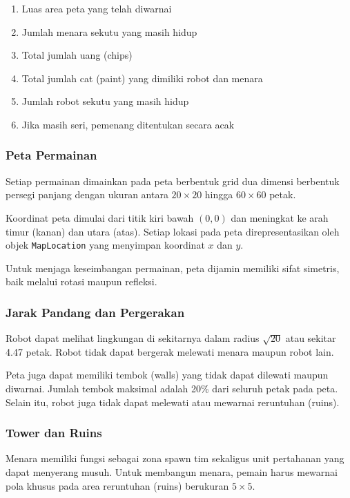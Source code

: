 \begin{enumerate}
\item Luas area peta yang telah diwarnai
\item Jumlah menara sekutu yang masih hidup
\item Total jumlah uang (chips)
\item Total jumlah cat (paint) yang dimiliki robot dan menara
\item Jumlah robot sekutu yang masih hidup
\item Jika masih seri, pemenang ditentukan secara acak
\end{enumerate}

\subsubsection{Peta Permainan}

Setiap permainan dimainkan pada peta berbentuk grid dua dimensi berbentuk persegi panjang dengan ukuran antara $20 \times 20$ hingga $60 \times 60$ petak.

Koordinat peta dimulai dari titik kiri bawah $(0,0)$ dan meningkat ke arah timur (kanan) dan utara (atas). Setiap lokasi pada peta direpresentasikan oleh objek \texttt{MapLocation} yang menyimpan koordinat $x$ dan $y$.

Untuk menjaga keseimbangan permainan, peta dijamin memiliki sifat simetris, baik melalui rotasi maupun refleksi.

\subsubsection{Jarak Pandang dan Pergerakan}

Robot dapat melihat lingkungan di sekitarnya dalam radius $\sqrt{20}$ atau sekitar 4.47 petak. Robot tidak dapat bergerak melewati menara maupun robot lain.

Peta juga dapat memiliki tembok (walls) yang tidak dapat dilewati maupun diwarnai. Jumlah tembok maksimal adalah 20\% dari seluruh petak pada peta. Selain itu, robot juga tidak dapat melewati atau mewarnai reruntuhan (ruins).

\subsubsection{Tower dan Ruins}

Menara memiliki fungsi sebagai zona spawn tim sekaligus unit pertahanan yang dapat menyerang musuh. Untuk membangun menara, pemain harus mewarnai pola khusus pada area reruntuhan (ruins) berukuran $5 \times 5$.

